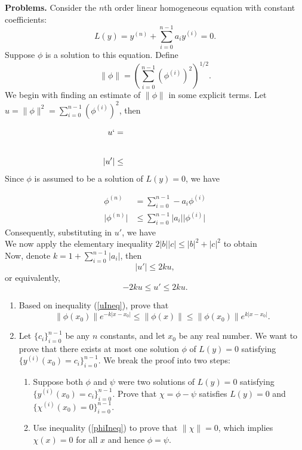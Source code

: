 \documentclass[10pt]{article}
\title{}
\date{}
\newcommand{\norm}[1]{\lVert #1 \rVert}
\newcommand{\abs}[1]{\lvert #1 \rvert}
\begin{document}
\noindent
{\bf Problems.}
Consider the $n$th order linear homogeneous equation with constant coefficients:
\[
	L(y) =y^{(n)} +  \sum_{i = 0}^{n - 1}a_iy^{(i)} = 0.
\]
Suppose $\phi$ is a solution to this equation. Define
\[
\norm{\phi} = \left(\sum_{i = 0}^{n - 1} {\left(\phi^{(i)}\right)^2}\right)^{1/2}.
\]
We begin with finding an estimate of $\norm{\phi}$ in some explicit terms. Let $u = \norm{\phi}^2 = \sum_{i = 0}^{n - 1} {\left(\phi^{(i)}\right)^2}$, then

\begin{align*}
u ` &=\hspace{10em} \\[2em]
\abs{u'}& \leq\\
\end{align*}
Since $\phi$ is assumed to be a solution of $L(y) = 0$, we have

\begin{align*}
	\phi^{(n)} &= \sum_{i = 0}^{n - 1} -a_i\phi^{(i)}\\
	\abs{\phi^{(n)}} &\leq  \sum_{i = 0}^{n - 1} \abs{a_i}\abs{\phi^{(i)}}
\end{align*}
Consequently, substituting in $u'$, we have
\\
We now apply the elementary inequality $2\abs{b}\abs{c} \leq \abs{b}^2 + \abs{c}^2$
to obtain
\\
Now, denote $k =1 + \sum_{i = 0}^{n - 1}\abs{a_i}$, then 
\[
\abs{u'} \leq 2ku,
\]
or equivalently, 
\begin{equation}
\label{uIneq}
-2ku \leq {u'} \leq 2ku.
\end{equation}
\clearpage
\begin{enumerate}
\item
Based on inequality (\ref{uIneq}), prove that
\begin{equation}
\label{phiIneq}
	\norm{\phi(x_0)}e^{-k\abs{x - x_0}} \leq \norm{\phi(x)}\leq \norm{\phi(x_0)}e^{k\abs{x - x_0}}.
\end{equation}
\item Let $\{c_i\}_{i=0}^{n-1}$ be any $n$ constants, and let $x_0$ be any real number. We want to prove that there exists at most one solution $\phi$  of $L(y) = 0$ satisfying $\{y^{(i)}(x_0) = c_i\}_{i=0}^{n-1}$. We break the proof into two steps:
\begin{enumerate}
\item
  Suppose both $\phi$ and $\psi$ were two solutions of $L(y) = 0$ satisfying $\{y^{(i)}(x_0) = c_i\}_{i=0}^{n-1}$. Prove that $\chi = \phi - \psi$ satisfies $L(y) = 0$ and $\{\chi^{(i)}(x_0) = 0\}_{i=0}^{n-1}$.
\item Use inequality (\ref{phiIneq}) to prove that $\norm{\chi} = 0$, which implies $\chi(x) = 0$ for all $x$ and hence $\phi = \psi$.
\end{enumerate}

\end{enumerate}
\end{document}
